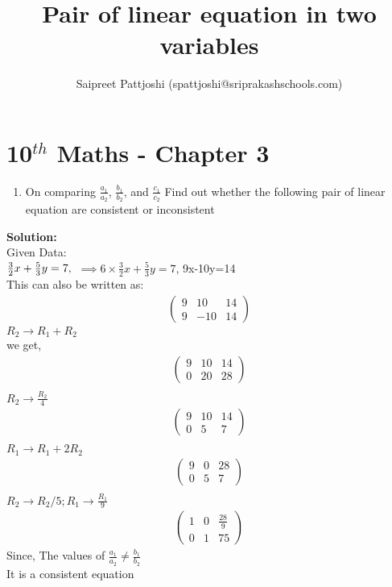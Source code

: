 \documentclass[12pt]{article}
\title{Pair of linear equation in two variables}
\author{Saipreet Pattjoshi (spattjoshi@sriprakashschools.com)}
\newcommand{\myvec}[1]{\ensuremath{\begin{pmatrix}#1\end{pmatrix}}}
\newcommand{\solution}{\noindent \textbf{Solution: }}
\begin{document}
\maketitle
\section*{10$^{th}$ Maths - Chapter 3}
\begin{enumerate}
\item  On comparing $\frac{a_1}{a_2}$, $\frac{b_1}{b_2}$, and $\frac{c_1}{c_2} $
Find out whether the following pair of linear equation are consistent or inconsistent\\
\end{enumerate}
\solution \\
Given Data:\\
$\frac{3}{2}x + \frac{5}{3}y=7,\\$
$\implies 6 \times \frac{3}{2}x + \frac{5}{3}y=7$,
9x-10y=14\\
This can also be written as:
\begin{align}
\myvec{9&10&14\\9&-10&14}
\end{align}
$R_2 \xrightarrow\ R_1 + R_2$\\ 
we get,
\begin{align}
\myvec{9&10&14\\0&20&28}\\
\end{align}
$R_2 \xrightarrow\ \frac{R_2}{4}$
\begin{align}
\myvec{9&10&14\\0&5&7}\\
\end{align}
$R_1 \xrightarrow\ R_1+2R_2$
\begin{align}
\myvec{9&0&28\\0&5&7}\\
\end{align}
$R_2 \xrightarrow\ R_2/5 ; R_1\xrightarrow\ \frac{R_1}{9}$\\
\begin{align}
\myvec{1&0&\frac{28}{9}\\0&1&{7}{5}}
\end{align}
Since, The values of $\frac{a_1}{a_2} \neq \frac{b_1}{b_2}$\\
It is a consistent equation
\end{document}
